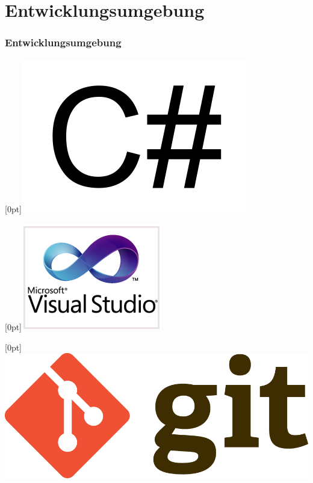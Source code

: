 \documentclass[t]{beamer}
\begin{document}
\section{Entwicklungsumgebung}
\begin{frame}
	\frametitle{Entwicklungsumgebung}
	\begin{minipage}{5,5cm}
	\centering
	\raisebox{-2.5cm}[0pt]{\includegraphics[scale=.2]{img/logos/csharp-logo.png}}
	\end{minipage}
	\begin{minipage}{5,5cm}
	\centering
	\raisebox{-2.5cm}[0pt]{\includegraphics[scale=.4]{img/logos/visual-studio-2010-logo.png}}
	\end{minipage}
	\begin{minipage}{5,5cm}
	\centering
	\raisebox{-1.5cm}[0pt]{\includegraphics[scale=.4]{img/libsFrameworks/git.png}}
	\end{minipage}

\end{frame}
\end{document}

